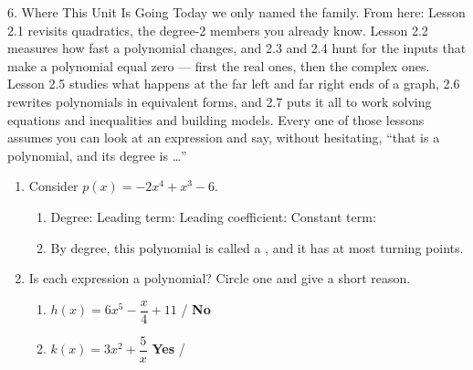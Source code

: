 \documentclass[10pt]{article}
\begin{document}
\vspace{0.1in}

\boxguard
\begin{notesbox}{6. Where This Unit Is Going}
Today we only named the family. From here: Lesson 2.1 revisits quadratics, the
degree-2 members you already know. Lesson 2.2 measures how fast a polynomial
changes, and 2.3 and 2.4 hunt for the inputs that make a polynomial equal zero
--- first the real ones, then the complex ones. Lesson 2.5 studies what happens at
the far left and far right ends of a graph, 2.6 rewrites polynomials in equivalent
forms, and 2.7 puts it all to work solving equations and inequalities and building
models. Every one of those lessons assumes you can look at an expression and say,
without hesitating, ``that is a polynomial, and its degree is \ldots''
\end{notesbox}

\vspace{0.1in}

\boxguard
\begin{practicebox}
\begin{enumerate}[itemsep=8pt]
  \item Consider $p(x) = -2x^4 + x^3 - 6$.

        \begin{enumerate}[label=(\alph*), itemsep=4pt]
          \item Degree:  \quad Leading term:  \quad
                Leading coefficient:  \quad
                Constant term: 
          \item By degree, this polynomial is called a , and it has
                at most  turning points.
        \end{enumerate}

  \item Is each expression a polynomial? Circle one and give a short reason.

        \begin{enumerate}[label=(\alph*), itemsep=6pt]
          \item $h(x) = 6x^5 - \dfrac{x}{4} + 11$ \quad {} / \textbf{No}

                \vspace{0.05in}

          \item $k(x) = 3x^2 + \dfrac{5}{x}$ \quad \textbf{Yes} / 

                \vspace{0.05in}
        \end{enumerate}
\end{enumerate}
\end{practicebox}
\end{document}
